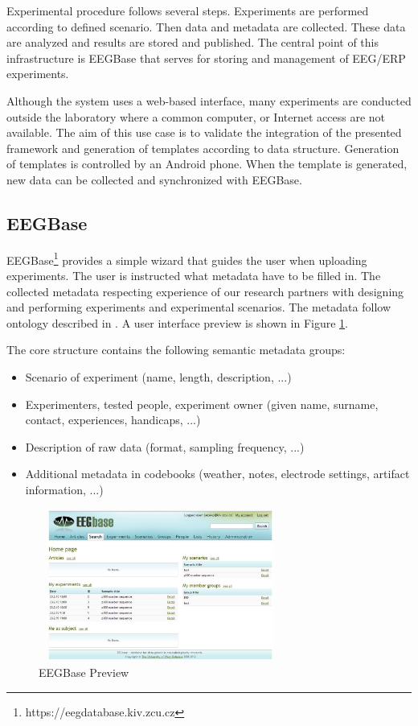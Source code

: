 \documentclass[a4paper,twoside]{article}
\begin{document}
Experimental procedure follows several steps.  Experiments are performed according to defined scenario. Then data and metadata are collected. These data are analyzed and results are stored and published. The central point of this infrastructure is EEGBase \cite{DBLP:conf/biostec/JezekSBM13} that serves for storing and management of EEG/ERP experiments.

Although the system uses a web-based interface, many experiments are conducted outside the laboratory where a common computer, or Internet access are not available. The aim of this use case is to validate the integration of the presented framework and generation of templates according to data structure. Generation of templates is controlled by an Android phone. When the template is generated, new data can be collected and synchronized with EEGBase.

\subsection{EEGBase} \label{Portal}



EEGBase\footnote{https://eegdatabase.kiv.zcu.cz} provides a simple wizard that guides the user when uploading experiments. The user is instructed what metadata have to be filled in. The collected metadata respecting experience of our research partners with designing and performing experiments and experimental scenarios. The metadata follow ontology described in \cite{BMEI_jezek_moucek}. A user interface preview is shown in Figure \ref{portal}.

The core structure contains the following semantic metadata groups:

\begin{itemize}
\item Scenario of experiment (name, length, description, ...)
\item Experimenters, tested people, experiment owner (given name, surname, contact, experiences, handicaps, ...)
\item Description of raw data (format, sampling frequency, ...)
\item Additional metadata in codebooks (weather, notes, electrode settings, artifact information, ...)
\end{itemize}


\begin{figure}
\centering\includegraphics[width=8cm, height=5cm]{portal_preview}
\caption{\label{portal}EEGBase Preview}

\end{figure}
\end{document}
